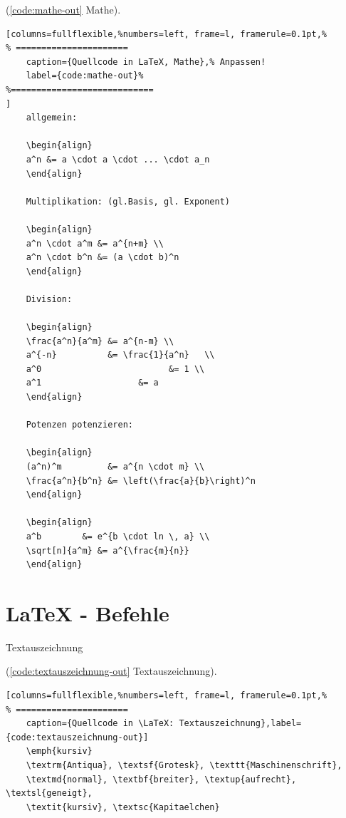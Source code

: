 (\autoref{code:mathe-out} Mathe).
\lstset{language=[LaTeX]TeX} %
\begin{lstlisting}[columns=fullflexible,%numbers=left, frame=l, framerule=0.1pt,%
% ======================
	caption={Quellcode in LaTeX, Mathe},% Anpassen!
	label={code:mathe-out}%
%============================
]
	allgemein:

	\begin{align}
	a^n &= a \cdot a \cdot ... \cdot a_n
	\end{align}

	Multiplikation: (gl.Basis, gl. Exponent)

	\begin{align}
	a^n \cdot a^m &= a^{n+m} \\
	a^n \cdot b^n &= (a \cdot b)^n
	\end{align}

	Division:

	\begin{align}
	\frac{a^n}{a^m} &= a^{n-m} \\
	a^{-n}          &= \frac{1}{a^n}   \\
	a^0 						&= 1 \\
	a^1				      &= a
	\end{align}

	Potenzen potenzieren:

	\begin{align}
	(a^n)^m         &= a^{n \cdot m} \\
	\frac{a^n}{b^n} &= \left(\frac{a}{b}\right)^n
	\end{align}

	\begin{align}
	a^b        &= e^{b \cdot ln \, a} \\
	\sqrt[n]{a^m} &= a^{\frac{m}{n}}
	\end{align}
\end{lstlisting}

\newpage

\section{LaTeX - Befehle}

Textauszeichnung

(\autoref{code:textauszeichnung-out} Textauszeichnung).
\lstset{language=[LaTeX]TeX} %
\begin{lstlisting}[columns=fullflexible,%numbers=left, frame=l, framerule=0.1pt,%
% ======================
	caption={Quellcode in \LaTeX: Textauszeichnung},label={code:textauszeichnung-out}]
	\emph{kursiv}
	\textrm{Antiqua}, \textsf{Grotesk}, \texttt{Maschinenschrift},
	\textmd{normal}, \textbf{breiter}, \textup{aufrecht}, \textsl{geneigt},
	\textit{kursiv}, \textsc{Kapitaelchen}
\end{lstlisting}

